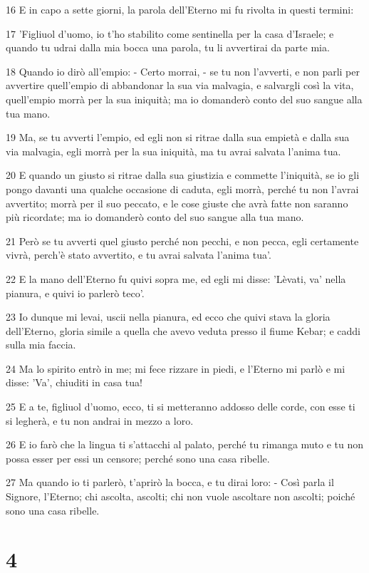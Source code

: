 \par 16 E in capo a sette giorni, la parola dell'Eterno mi fu rivolta in questi termini:
\par 17 'Figliuol d'uomo, io t'ho stabilito come sentinella per la casa d'Israele; e quando tu udrai dalla mia bocca una parola, tu li avvertirai da parte mia.
\par 18 Quando io dirò all'empio: - Certo morrai, - se tu non l'avverti, e non parli per avvertire quell'empio di abbandonar la sua via malvagia, e salvargli così la vita, quell'empio morrà per la sua iniquità; ma io domanderò conto del suo sangue alla tua mano.
\par 19 Ma, se tu avverti l'empio, ed egli non si ritrae dalla sua empietà e dalla sua via malvagia, egli morrà per la sua iniquità, ma tu avrai salvata l'anima tua.
\par 20 E quando un giusto si ritrae dalla sua giustizia e commette l'iniquità, se io gli pongo davanti una qualche occasione di caduta, egli morrà, perché tu non l'avrai avvertito; morrà per il suo peccato, e le cose giuste che avrà fatte non saranno più ricordate; ma io domanderò conto del suo sangue alla tua mano.
\par 21 Però se tu avverti quel giusto perché non pecchi, e non pecca, egli certamente vivrà, perch'è stato avvertito, e tu avrai salvata l'anima tua'.
\par 22 E la mano dell'Eterno fu quivi sopra me, ed egli mi disse: 'Lèvati, va' nella pianura, e quivi io parlerò teco'.
\par 23 Io dunque mi levai, uscii nella pianura, ed ecco che quivi stava la gloria dell'Eterno, gloria simile a quella che avevo veduta presso il fiume Kebar; e caddi sulla mia faccia.
\par 24 Ma lo spirito entrò in me; mi fece rizzare in piedi, e l'Eterno mi parlò e mi disse: 'Va', chiuditi in casa tua!
\par 25 E a te, figliuol d'uomo, ecco, ti si metteranno addosso delle corde, con esse ti si legherà, e tu non andrai in mezzo a loro.
\par 26 E io farò che la lingua ti s'attacchi al palato, perché tu rimanga muto e tu non possa esser per essi un censore; perché sono una casa ribelle.
\par 27 Ma quando io ti parlerò, t'aprirò la bocca, e tu dirai loro: - Così parla il Signore, l'Eterno; chi ascolta, ascolti; chi non vuole ascoltare non ascolti; poiché sono una casa ribelle.

\chapter{4}

